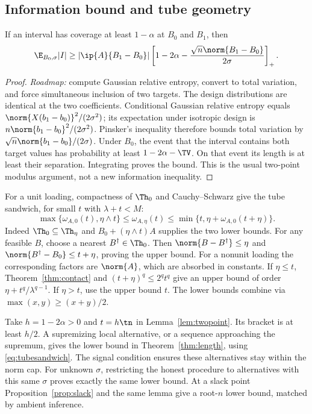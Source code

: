 \subsection{Information bound and tube geometry}
\begin{lemma}\label{lem:twopoint}
If an interval has coverage at least $1-\alpha$ at $B_0$ and $B_1$, then
\[
 \E_{B_0,\sigma}|I|\ge|\ip{A}{B_1-B_0}|
 \left[1-2\alpha-\frac{\sqrt n\norm{B_1-B_0}}{2\sigma}\right]_+.
\]
\end{lemma}
\begin{proof}
\emph{Roadmap:} compute Gaussian relative entropy, convert to total variation, and force simultaneous inclusion of two targets. The design distributions are identical at the two coefficients. Conditional Gaussian relative entropy equals $\norm{X(b_1-b_0)}^2/(2\sigma^2)$; its expectation under isotropic design is $n\norm{b_1-b_0}^2/(2\sigma^2)$. Pinsker's inequality therefore bounds total variation by $\sqrt n\norm{b_1-b_0}/(2\sigma)$. Under $B_0$, the event that the interval contains both target values has probability at least $1-2\alpha-\TV$. On that event its length is at least their separation. Integrating proves the bound. This is the usual two-point modulus argument, not a new information inequality.
\end{proof}

For a unit loading, compactness of $\Th_0$ and Cauchy--Schwarz give the tube sandwich, for small $t$ with $\lambda+t<M$:
\begin{equation}\label{eq:tubesandwich}
 \max\{\omega_{A,0}(t),\eta\wedge t\}
 \le\omega_{A,\eta}(t)
 \le\min\{t,\eta+\omega_{A,0}(t+\eta)\}.
\end{equation}
Indeed $\Th_0\subseteq\Th_\eta$ and $B_0+(\eta\wedge t)A$ supplies the two lower bounds. For any feasible $B$, choose a nearest $B^\dagger\in\Th_0$. Then $\norm{B-B^\dagger}\le\eta$ and $\norm{B^\dagger-B_0}\le t+\eta$, proving the upper bound. For a nonunit loading the corresponding factors are $\norm{A}$, which are absorbed in constants. If $\eta\le t$, Theorem~\ref{thm:contact} and $(t+\eta)^q\le2^qt^q$ give an upper bound of order $\eta+t^q/\lambda^{q-1}$. If $\eta>t$, use the upper bound $t$. The lower bounds combine via $\max(x,y)\ge(x+y)/2$.

Take $h=1-2\alpha>0$ and $t=h\tn$ in Lemma~\ref{lem:twopoint}. Its bracket is at least $h/2$. A supremizing local alternative, or a sequence approaching the supremum, gives the lower bound in Theorem~\ref{thm:length}, using \eqref{eq:tubesandwich}. The signal condition ensures these alternatives stay within the norm cap. For unknown $\sigma$, restricting the honest procedure to alternatives with this same $\sigma$ proves exactly the same lower bound. At a slack point Proposition~\ref{prop:slack} and the same lemma give a root-$n$ lower bound, matched by ambient inference.

